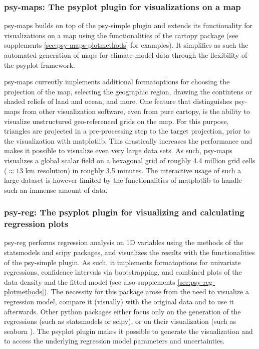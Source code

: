 \begin{refsection}
\subsubsection{psy-maps: The psyplot plugin for visualizations on a map}

psy-maps builds on top of the psy-simple plugin and extends its functionality for visualizations on a map using the functionalities of the cartopy package \citep{Cartopy} (see supplements \ref{sec:psy-maps-plotmethods} for examples). It simplifies as such the automated generation of maps for climate model data through the flexibility of the psyplot framework.

psy-maps currently implements additional formatoptions for choosing the projection of the map, selecting the geographic region, drawing the contintens or shaded reliefs of land and ocean, and more. One feature that distinguishes psy-maps from other visualization software, even from pure cartopy, is the ability to visualize unstructured geo-referenced grids on the map. For this purpose, triangles are projected in a pre-processing step to the target projection, prior to the visualization with matplotlib. This drastically increases the performance and makes it possible to visualize even very large data sets. As such, psy-maps visualizes a global scalar field on a hexagonal grid of roughly 4.4 million grid cells ($\approx 13$ km resolution) in roughly 3.5 minutes. The interactive usage of such a large dataset is however limited by the functionalities of matplotlib to handle such an immense amount of data.

\subsubsection{psy-reg: The psyplot plugin for visualizing and calculating regression plots}

psy-reg performs regression analysis on 1D variables using the methods of the statsmodels \citep{SeaboldPerktold2010} and scipy \citep{JonesOliphantPetersonEtAl2001, Oliphant2007} packages, and visualizes the results with the functionalities of the psy-simple plugin. As such, it implements formatoptions for univariate regressions, confidence intervals via bootstrapping, and combined plots of the data density and the fitted model (see also supplements \ref{sec:psy-reg-plotmethods}). The necessity for this package arose from the need to visualize a regression model, compare it (visually) with the original data and to use it afterwards. Other python packages either focus only on the generation of the regressions (such as statsmodels or scipy), or on their visualization (such as seaborn \citep{WaskomBotvinnikOKaneEtAl2018}). The psyplot plugin makes it possible to generate the visualization and to access the underlying regression model parameters and uncertainties.


\end{refsection}
